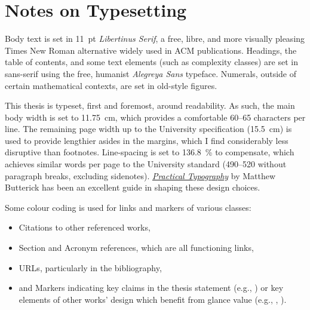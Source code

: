 \chapter*{Notes on Typesetting}

Body text is set in \qty{11}{pt} \emph{Libertinus Serif}, a free, libre, and more visually pleasing Times New Roman alternative widely used in ACM publications.
Headings, the table of contents, and some text elements (such as complexity classes) are set in sans-serif using the free, humanist \emph{Alegreya Sans} typeface.
Numerals, outside of certain mathematical contexts, are set in old-style figures.

This thesis is typeset, first and foremost, around readability.
As such, the main body width is set to \qty{11.75}{\centi\metre}, which provides a comfortable \numrange{60}{65} characters per line.
The remaining page width up to the University specification (\qty{15.5}{\centi\metre}) is used to provide lengthier asides in the margins, which I find considerably less disruptive than footnotes.
Line-spacing is set to \qty{136.8}{\percent} to compensate, which achieves similar words per page to the University standard (\numrange{490}{520} without paragraph breaks, excluding sidenotes).
\emph{\href{https://practicaltypography.com/}{Practical Typography}} by Matthew Butterick has been an excellent guide in shaping these design choices.

Some colour coding is used for links and markers of various classes:
\begin{itemize}
	\item {\color{kthesis-cite}Citations} to other referenced works,
	\item {\color{kthesis-internal}Section and Acronym} references, which are all functioning links,
	\item {\color{kthesis-url}URLs}, particularly in the bibliography,
	\item and {\color{kthesis-glance}Markers} indicating key claims in the thesis statement (e.g., ) or key elements of other works' design which benefit from glance value (e.g., \rllitstate, \rllitact).
\end{itemize}